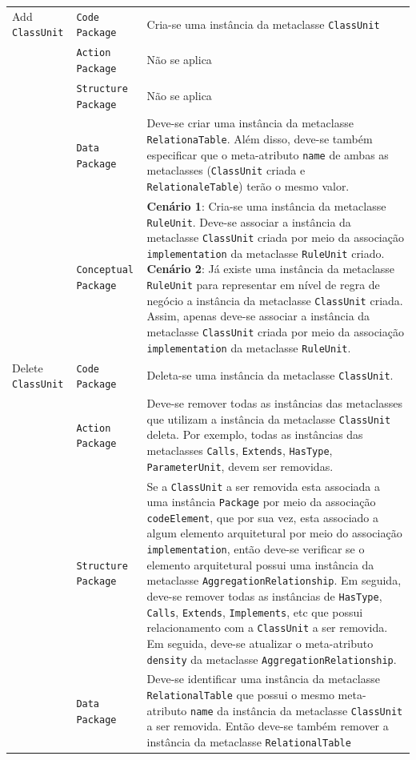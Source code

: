 \begin{longtable}{ | m{1.9cm} | m{3.57cm}| m{9.3cm} | }
 Add \texttt{ClassUnit} & \texttt{Code Package} & Cria-se uma instância da metaclasse \texttt{ClassUnit}\tabularnewline
\cline{2-3} 
\cline{2-3} 
 & \texttt{Action Package} & Não se aplica \tabularnewline
 \cline{2-3} 
 & \texttt{Structure Package} & Não se aplica \tabularnewline
\cline{2-3} 
 & \texttt{Data Package} & Deve-se criar uma instância da metaclasse \texttt{RelationaTable}. Além disso, deve-se também especificar que o meta-atributo \texttt{name} de ambas as metaclasses (\texttt{ClassUnit} criada e \texttt{RelationaleTable}) terão o mesmo valor. \tabularnewline
\cline{2-3} 
 & \texttt{Conceptual Package} & \textbf{Cenário 1}: Cria-se uma instância da metaclasse \texttt{RuleUnit}. Deve-se associar a instância da metaclasse \texttt{ClassUnit} criada por meio da associação \texttt{implementation} da metaclasse \texttt{RuleUnit} criado. \textbf{Cenário 2}: Já existe uma instância da metaclasse \texttt{RuleUnit} para representar em nível de regra de negócio a instância da metaclasse \texttt{ClassUnit} criada. Assim, apenas deve-se associar a instância da metaclasse \texttt{ClassUnit} criada por meio da associação \texttt{implementation} da metaclasse \texttt{RuleUnit}. \tabularnewline
\hline 
 Delete \texttt{ClassUnit} & \texttt{Code Package} & Deleta-se uma instância da metaclasse \texttt{ClassUnit}.\tabularnewline
\cline{2-3} 
& \texttt{Action Package} & Deve-se remover todas as instâncias das metaclasses que utilizam a instância da metaclasse \texttt{ClassUnit} deleta. Por exemplo, todas as instâncias das metaclasses \texttt{Calls}, \texttt{Extends}, \texttt{HasType}, \texttt{ParameterUnit}, devem ser removidas. \tabularnewline
\cline{2-3}
& \texttt{Structure Package} & Se a \texttt{ClassUnit} a ser removida esta associada a uma instância \texttt{Package} por meio da associação \texttt{codeElement}, que por sua vez, esta associado a algum elemento arquitetural por meio do associação \texttt{implementation}, então deve-se verificar se o elemento arquitetural possui uma instância da metaclasse \texttt{AggregationRelationship}. Em seguida, deve-se remover todas as instâncias de \texttt{HasType}, \texttt{Calls}, \texttt{Extends}, \texttt{Implements}, etc que possui relacionamento com a \texttt{ClassUnit} a ser removida. Em seguida, deve-se atualizar o meta-atributo \texttt{density} da metaclasse \texttt{AggregationRelationship}. \tabularnewline
\cline{2-3}
& \texttt{Data Package} & Deve-se identificar uma instância da metaclasse \texttt{RelationalTable} que possui o mesmo meta-atributo \texttt{name} da instância da metaclasse \texttt{ClassUnit} a ser removida. Então deve-se também remover a instância da metaclasse \texttt{RelationalTable} \tabularnewline

\end{longtable}
